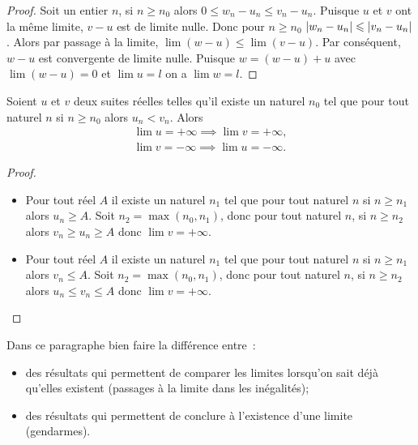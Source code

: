\begin{proof}
    Soit un entier \(n\), si \(n \geqslant n_0\) alors \(0 \leqslant w_n-u_n 
    \leqslant v_n -u_n\). Puisque \(u\) et \(v\) ont la même limite, \(v-u\) est 
    de limite nulle. Donc pour \(n \geqslant n_0\) \(\left\lvert w_n-u_n\right\rvert \leqslant 
    \left\lvert v_n-u_n\right\rvert\). Alors par passage à la limite, \(\lim (w-u) \leqslant \lim 
    (v-u)\). Par conséquent, \(w-u\) est convergente de limite nulle. Puisque \(w 
    = (w-u)+u\) avec \(\lim (w-u) = 0\) et \(\lim u = l\) on a \(\lim w =l\).
\end{proof}
\begin{prop}
    Soient \(u\) et \(v\) deux suites réelles telles qu'il existe un naturel 
    \(n_0\) tel que pour tout naturel \(n\) si \(n \geqslant n_0\) alors 
    \(u_n<v_n\). Alors
    \begin{gather}
        \lim u =+\infty \implies \lim v =+\infty,\\
        \lim v =-\infty \implies \lim u =-\infty.
    \end{gather}
\end{prop}
\begin{proof}
    \begin{itemize}
        \item Pour tout réel \(A\) il existe un naturel \(n_1\) tel que pour tout 
            naturel \(n\) si \(n \geqslant n_1\) alors \(u_n \geqslant A\). Soit \(n_2 
            = \max(n_0,n_1)\), donc pour tout naturel \(n\), si \(n \geqslant n_2\) 
            alors \(v_n \geqslant u_n \geqslant A\) donc \(\lim v = +\infty\).
        \item Pour tout réel \(A\) il existe un naturel \(n_1\) tel que pour tout 
            naturel \(n\) si \(n \geqslant n_1\) alors \(v_n \leqslant A\). Soit \(n_2 
            = \max(n_0,n_1)\), donc pour tout naturel \(n\), si \(n \geqslant n_2\) 
            alors \(u_n \leqslant v_n \leqslant A\) donc \(\lim v = +\infty\).
    \end{itemize}
\end{proof}
Dans ce paragraphe bien faire la différence entre~:
\begin{itemize}
    \item des résultats qui permettent de comparer les limites lorsqu'on sait déjà 
        qu'elles existent (passages à la limite dans les inégalités);
    \item des résultats qui permettent de conclure à l'existence d'une limite 
        (gendarmes).
\end{itemize}

